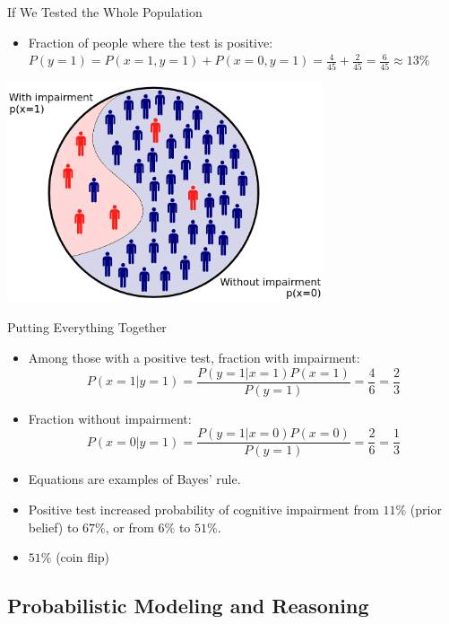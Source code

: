 \documentclass{beamer}
\begin{document}
\begin{frame}{If We Tested the Whole Population}
  \begin{itemize}
    \item Fraction of people where the test is positive:
      \(
        P(y=1) = P(x=1, y=1) + P(x=0, y=1) = \frac{4}{45} + \frac{2}{45} = \frac{6}{45} \approx 13\%
      \)
  \end{itemize}
  \begin{center}
    \includegraphics[width=0.7\textwidth]{whole_population.png}
  \end{center}
\end{frame}



\begin{frame}{Putting Everything Together}
\begin{itemize}
  \item Among those with a positive test, fraction with impairment:
  \[
  P(x = 1|y = 1) = \frac{P(y = 1|x = 1)P(x = 1)}{P(y = 1)} = \frac{4}{6} = \frac{2}{3}
  \]
  \item Fraction without impairment:
  \[
  P(x = 0|y = 1) = \frac{P(y = 1|x = 0)P(x = 0)}{P(y = 1)} = \frac{2}{6} = \frac{1}{3}
  \]
  \item Equations are examples of Bayes' rule.
  \item Positive test increased probability of cognitive impairment from $11\%$ (prior belief) to $67\%$, or from $6\%$ to $51\%$.
  \item $51\%$ (coin flip)
\end{itemize}
\end{frame}

\subsection{Probabilistic Modeling and Reasoning}
\end{document}
